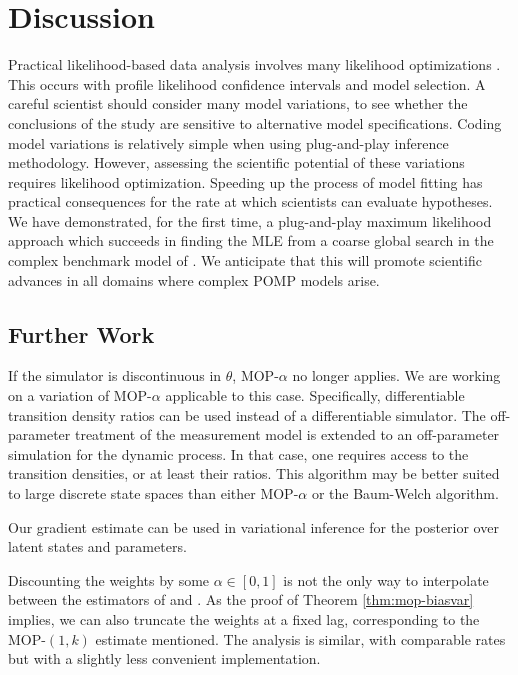 \documentclass[numsec,webpdf,modern,medium,namedate]{oup-authoring-template}
\theoremstyle{thmstyleone}%
\theoremstyle{thmstyletwo}%
\theoremstyle{thmstylethree}%
\begin{document}
\section{Discussion}

Practical likelihood-based data analysis involves many likelihood optimizations \citep{king08,blake14,pons-salort18,subramanian21,fox22,drake23}.
This occurs with profile likelihood confidence intervals and model selection. A careful scientist should consider many model variations, to see whether the conclusions of the study are sensitive to alternative model specifications.
Coding model variations is relatively simple when using plug-and-play inference methodology.
However, assessing the scientific potential of these variations requires likelihood optimization.
Speeding up the process of model fitting has practical consequences for the rate at which scientists can evaluate hypotheses.
We have demonstrated, for the first time, a plug-and-play maximum likelihood approach which succeeds in finding the MLE from a coarse global search in the complex benchmark model of \cite{king08}.
We anticipate that this will promote scientific advances in all domains where complex POMP models arise.


\subsection{Further Work}

If the simulator is discontinuous in $\theta$, MOP-$\alpha$ no longer applies.
We are working on a variation of MOP-$\alpha$ applicable to this case.
Specifically, differentiable transition density ratios can be used instead of a differentiable simulator.
The off-parameter treatment of the measurement model is extended to an off-parameter simulation for the dynamic process.
In that case, one requires access to the transition densities, or at least their ratios. 
This algorithm may be better suited to large discrete state spaces than either MOP-$\alpha$ or the Baum-Welch algorithm.

Our gradient estimate can be used in variational inference for the posterior over latent states \citep{naesseth18} and parameters. 

Discounting the weights by some $\alpha \in [0,1]$ is not the only way to interpolate between the estimators of \cite{naesseth18} and \cite{poyiadjis11}. 
As the proof of Theorem \ref{thm:mop-biasvar} implies, we can also truncate the weights at a fixed lag, corresponding to the MOP-$(1,k)$ estimate mentioned. 
The analysis is similar, with comparable rates but with a slightly less convenient implementation. 
\end{document}
